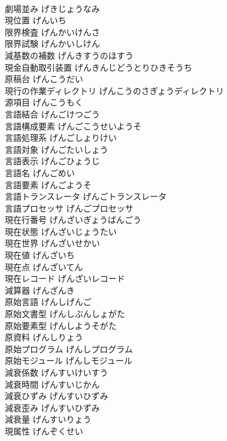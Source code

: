 \documentclass[8pt]{extreport}
\begin{document}
\begin{CJK}{UTF8}{min}
\\	劇場並み	げきじょうなみ	
\\	現位置	げんいち	
\\	限界検査	げんかいけんさ	
\\	限界試験	げんかいしけん	
\\	減基数の補数	げんきすうのほすう	
\\	現金自動取引装置	げんきんじどうとりひきそうち	
\\	原稿台	げんこうだい	
\\	現行の作業ディレクトリ	げんこうのさぎょうディレクトリ	
\\	源項目	げんこうもく	
\\	言語結合	げんごけつごう	
\\	言語構成要素	げんごこうせいようそ	
\\	言語処理系	げんごしょりけい	
\\	言語対象	げんごたいしょう	
\\	言語表示	げんごひょうじ	
\\	言語名	げんごめい	
\\	言語要素	げんごようそ	
\\	言語トランスレータ	げんごトランスレータ	
\\	言語プロセッサ	げんごプロセッサ	
\\	現在行番号	げんざいぎょうばんごう	
\\	現在状態	げんざいじょうたい	
\\	現在世界	げんざいせかい	
\\	現在値	げんざいち	
\\	現在点	げんざいてん	
\\	現在レコード	げんざいレコード	
\\	減算器	げんざんき	
\\	原始言語	げんしげんご	
\\	原始文書型	げんしぶんしょがた	
\\	原始要素型	げんしようそがた	
\\	原資料	げんしりょう	
\\	原始プログラム	げんしプログラム	
\\	原始モジュール	げんしモジュール	
\\	減衰係数	げんすいけいすう	
\\	減衰時間	げんすいじかん	
\\	減衰ひずみ	げんすいひずみ	
\\	減衰歪み	げんすいひずみ	
\\	減衰量	げんすいりょう	
\\	現属性	げんぞくせい	

\end{CJK}
\end{document}
